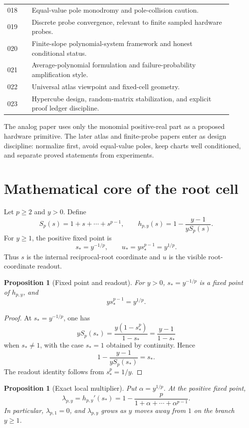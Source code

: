 \documentclass[11pt]{article}
\newtheorem{proposition}[definition]{Proposition}
\newcommand{\Sp}{S_p}
\newcommand{\hp}{h_{p,y}}
\begin{document}
\begin{center}
\begin{tabular}{@{}p{0.10\linewidth}p{0.82\linewidth}@{}}
018 & Equal-value pole monodromy and pole-collision caution.\\
019 & Discrete probe convergence, relevant to finite sampled hardware probes.\\
020 & Finite-slope polynomial-system framework and honest conditional status.\\
021 & Average-polynomial formulation and failure-probability amplification style.\\
022 & Universal atlas viewpoint and fixed-cell geometry.\\
023 & Hypercube design, random-matrix stabilization, and explicit proof ledger discipline.\\
\bottomrule
\end{tabular}
\end{center}

The analog paper uses only the monomial positive-real part as a proposed
hardware primitive.  The later atlas and finite-probe papers enter as design
discipline: normalize first, avoid equal-value poles, keep charts well
conditioned, and separate proved statements from experiments.

\section{Mathematical core of the root cell}

Let \(p\ge 2\) and \(y>0\).  Define
\[
        \Sp(s)=1+s+\cdots+s^{p-1},
        \qquad
        \hp(s)=1-\frac{y-1}{y\Sp(s)}.
\]
For \(y\ge1\), the positive fixed point is
\[
        s_*=y^{-1/p},
        \qquad
        u_*=y s_*^{p-1}=y^{1/p}.
\]
Thus \(s\) is the internal reciprocal-root coordinate and \(u\) is the visible
root-coordinate readout.

\begin{proposition}[Fixed point and readout]
For \(y>0\), \(s_*=y^{-1/p}\) is a fixed point of \(\hp\), and
\[
        y s_*^{p-1}=y^{1/p}.
\]
\end{proposition}

\begin{proof}
At \(s_*=y^{-1/p}\), one has
\[
        y\Sp(s_*)=\frac{y(1-s_*^p)}{1-s_*}
        =\frac{y-1}{1-s_*}
\]
when \(s_*\ne1\), with the case \(s_*=1\) obtained by continuity.  Hence
\[
        1-\frac{y-1}{y\Sp(s_*)}=s_*.
\]
The readout identity follows from \(s_*^p=1/y\).
\end{proof}

\begin{proposition}[Exact local multiplier]
Put \(\alpha=y^{1/p}\).  At the positive fixed point,
\[
        \lambda_{p,y}=\hp'(s_*)=
        1-\frac{p}{1+\alpha+\cdots+\alpha^{p-1}}.
\]
In particular, \(\lambda_{p,1}=0\), and \(\lambda_{p,y}\) grows as \(y\) moves
away from \(1\) on the branch \(y\ge1\).
\end{proposition}
\end{document}
